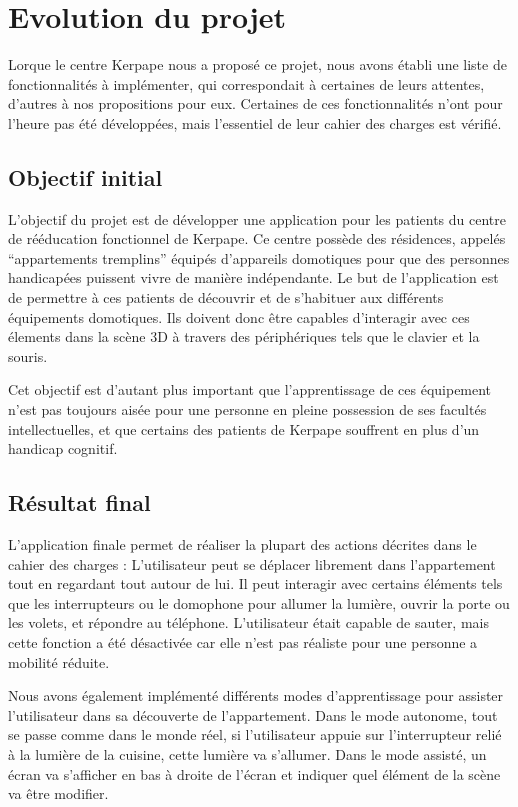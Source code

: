 \section{Evolution du projet}
Lorque le centre Kerpape nous a proposé ce projet, nous avons établi une liste de fonctionnalités à implémenter, qui correspondait à certaines de leurs attentes, d'autres à nos propositions pour eux.
Certaines de ces fonctionnalités n'ont pour l'heure pas été développées, mais l'essentiel de leur cahier des charges est vérifié.

\subsection{Objectif initial}
L'objectif du projet est de développer une application pour les patients du centre de rééducation fonctionnel de Kerpape. Ce centre possède des résidences, appelés \enquote{appartements tremplins} équipés d'appareils domotiques pour que des personnes handicapées puissent vivre de manière indépendante. Le but de l'application est de permettre à ces patients de découvrir et de s'habituer aux différents équipements domotiques. Ils doivent donc être capables d'interagir avec ces élements dans la scène 3D à travers des périphériques tels que le clavier et la souris.

Cet objectif est d'autant plus important que l'apprentissage de ces équipement n'est pas toujours aisée pour une personne en pleine possession de ses facultés intellectuelles, et que certains des patients de Kerpape souffrent en plus d'un handicap cognitif. 

\subsection{Résultat final}
L'application finale permet de réaliser la plupart des actions décrites dans le cahier des charges : L'utilisateur peut se déplacer librement dans l'appartement tout en regardant tout autour de lui. Il peut interagir avec certains éléments tels que les interrupteurs ou le domophone pour allumer la lumière, ouvrir la porte ou les volets, et répondre au téléphone. L'utilisateur était capable de sauter, mais cette fonction a été désactivée car elle n'est pas réaliste pour une personne a mobilité réduite.

Nous avons également implémenté différents modes d'apprentissage pour assister l'utilisateur dans sa découverte de l'appartement. Dans le mode autonome, tout se passe comme dans le monde réel, si l'utilisateur appuie sur l'interrupteur relié à la lumière de la cuisine, cette lumière va s'allumer. Dans le mode assisté, un écran va s'afficher en bas à droite de l'écran et indiquer quel élément de la scène va être modifier.


